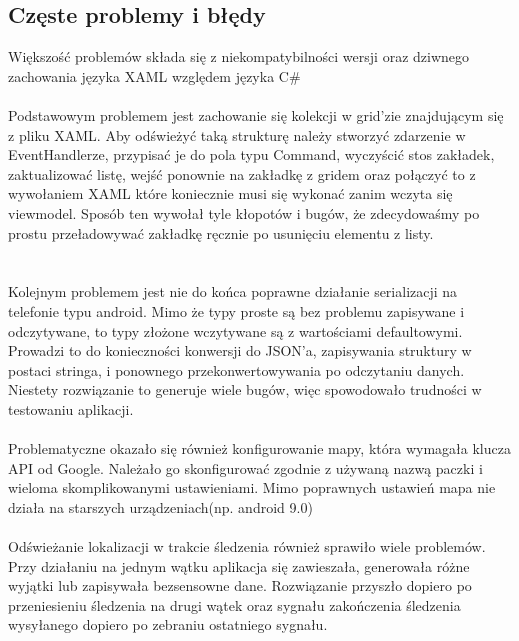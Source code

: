 \subsection{Częste problemy i błędy} %
Większość problemów składa się z niekompatybilności wersji oraz dziwnego zachowania języka XAML względem języka C\#\\\\
Podstawowym problemem jest zachowanie się kolekcji w grid'zie znajdującym się z pliku XAML. Aby odświeżyć taką strukturę należy stworzyć zdarzenie w EventHandlerze, przypisać je do pola typu Command, wyczyścić stos zakładek, zaktualizować listę, wejść ponownie na zakładkę z gridem oraz połączyć to z wywołaniem XAML które koniecznie musi się wykonać zanim wczyta się viewmodel. Sposób ten wywołał tyle kłopotów i bugów, że zdecydowaśmy po prostu przeładowywać zakładkę ręcznie po usunięciu elementu z listy.\\\\\\

Kolejnym problemem jest nie do końca poprawne działanie serializacji na telefonie typu android. Mimo że typy proste są bez problemu zapisywane i odczytywane, to typy złożone wczytywane są z wartościami defaultowymi. Prowadzi to do konieczności konwersji do JSON'a, zapisywania struktury w postaci stringa, i ponownego przekonwertowywania po odczytaniu danych. Niestety rozwiązanie to generuje wiele bugów, więc spowodowało trudności w testowaniu aplikacji.\\\\

Problematyczne okazało się również konfigurowanie mapy, która wymagała klucza API od Google. Należało go skonfigurować zgodnie z używaną nazwą paczki i wieloma skomplikowanymi ustawieniami. Mimo poprawnych ustawień mapa nie działa na starszych urządzeniach(np. android 9.0)\\\\

Odświeżanie lokalizacji w trakcie śledzenia również sprawiło wiele problemów. Przy działaniu na jednym wątku aplikacja się zawieszała, generowała różne wyjątki lub zapisywała bezsensowne dane. Rozwiązanie przyszło dopiero po przeniesieniu śledzenia na drugi wątek oraz sygnału zakończenia śledzenia wysyłanego dopiero po zebraniu ostatniego sygnału.
